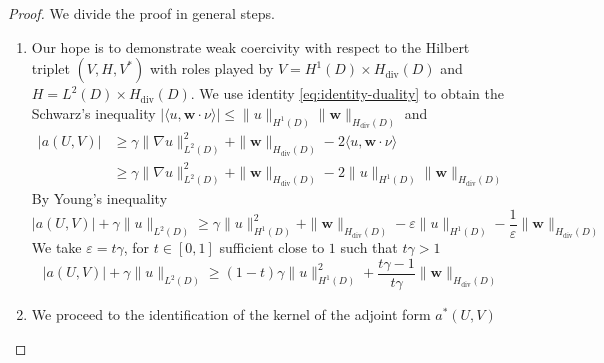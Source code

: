 \documentclass[10pt, a4paper, twoside, openright]{book}
\theoremstyle{definition}
\theoremstyle{plain}
\theoremstyle{plain}
\theoremstyle{plain}
\theoremstyle{plain}
\theoremstyle{plain}
\theoremstyle{plain}
\theoremstyle{plain}
\theoremstyle{plain}
\DeclareMathOperator{\divergence}{div}
\DeclareMathOperator{\real}{Re}
\let\phi\varphi
\let\epsilon\varepsilon
\begin{document}
\begin{proof}
We divide the proof in general steps.
 \begin{enumerate}
 \item 
 Our hope is to demonstrate weak coercivity with respect to the Hilbert triplet $(V,H,V^*)$ with roles played by $V=H^1(D)\times H_{\divergence}(D)$ and $H=L^2(D)\times H_{\divergence}(D)$.
 We use identity \ref{eq:identity-duality} to obtain the Schwarz's inequality $|\langle u ,\bm{w}\cdot\nu\rangle |\leq\|u\|_{H^1(D)}\|\bm{w}\|_{H_{\divergence}(D)}$ and
\begin{align}
 |a(U,V)|&\geq \gamma\|\nabla u\|_{L^2(D)}^2 + \|\bm{w}\|_{H_{\divergence}(D)}-2\langle u ,\bm{w}\cdot\nu\rangle \\
 &\geq \gamma\|\nabla u\|_{L^2(D)}^2 + \|\bm{w}\|_{H_{\divergence}(D)}-2\|u\|_{H^1(D)}\|\bm{w}\|_{H_{\divergence}(D)}
 \end{align}
 By Young's inequality
 \begin{equation}
 |a(U,V)| + \gamma\|u\|_{L^2(D)} \geq \gamma\|u\|_{H^1(D)}^2 + \|\bm{w}\|_{H_{\divergence}(D)}-\epsilon\|u\|_{H^1(D)} - \frac{1}{\epsilon}\|\bm{w}\|_{H_{\divergence}(D)}
 \end{equation}
 We take $\epsilon=t\gamma$, for $t\in[0,1]$ sufficient close to $1$ such that $t\gamma>1$
 \begin{equation}
  |a(U,V)| + \gamma\|u\|_{L^2(D)}\geq (1-t)\gamma\|u\|_{H^1(D)}^2 + \frac{t\gamma - 1}{t\gamma}\|\bm{w}\|_{H_{\divergence}(D)}
 \end{equation}
 \item We proceed to the identification of the kernel of the adjoint form $a^*(U,V)$ 
\begin{equation*}

\end{equation*}
\end{enumerate}
\end{proof}
\end{document}
